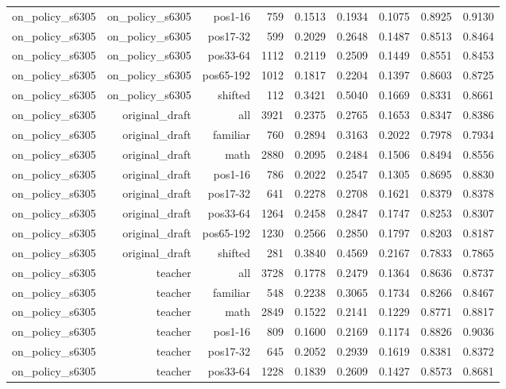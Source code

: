 \begin{tabular}{lrrrrrrrr}
on\_policy\_s6305 & on\_policy\_s6305 & pos1-16 & 759 & 0.1513 & 0.1934 & 0.1075 & 0.8925 & 0.9130 \\
on\_policy\_s6305 & on\_policy\_s6305 & pos17-32 & 599 & 0.2029 & 0.2648 & 0.1487 & 0.8513 & 0.8464 \\
on\_policy\_s6305 & on\_policy\_s6305 & pos33-64 & 1112 & 0.2119 & 0.2509 & 0.1449 & 0.8551 & 0.8453 \\
on\_policy\_s6305 & on\_policy\_s6305 & pos65-192 & 1012 & 0.1817 & 0.2204 & 0.1397 & 0.8603 & 0.8725 \\
on\_policy\_s6305 & on\_policy\_s6305 & shifted & 112 & 0.3421 & 0.5040 & 0.1669 & 0.8331 & 0.8661 \\
on\_policy\_s6305 & original\_draft & all & 3921 & 0.2375 & 0.2765 & 0.1653 & 0.8347 & 0.8386 \\
on\_policy\_s6305 & original\_draft & familiar & 760 & 0.2894 & 0.3163 & 0.2022 & 0.7978 & 0.7934 \\
on\_policy\_s6305 & original\_draft & math & 2880 & 0.2095 & 0.2484 & 0.1506 & 0.8494 & 0.8556 \\
on\_policy\_s6305 & original\_draft & pos1-16 & 786 & 0.2022 & 0.2547 & 0.1305 & 0.8695 & 0.8830 \\
on\_policy\_s6305 & original\_draft & pos17-32 & 641 & 0.2278 & 0.2708 & 0.1621 & 0.8379 & 0.8378 \\
on\_policy\_s6305 & original\_draft & pos33-64 & 1264 & 0.2458 & 0.2847 & 0.1747 & 0.8253 & 0.8307 \\
on\_policy\_s6305 & original\_draft & pos65-192 & 1230 & 0.2566 & 0.2850 & 0.1797 & 0.8203 & 0.8187 \\
on\_policy\_s6305 & original\_draft & shifted & 281 & 0.3840 & 0.4569 & 0.2167 & 0.7833 & 0.7865 \\
on\_policy\_s6305 & teacher & all & 3728 & 0.1778 & 0.2479 & 0.1364 & 0.8636 & 0.8737 \\
on\_policy\_s6305 & teacher & familiar & 548 & 0.2238 & 0.3065 & 0.1734 & 0.8266 & 0.8467 \\
on\_policy\_s6305 & teacher & math & 2849 & 0.1522 & 0.2141 & 0.1229 & 0.8771 & 0.8817 \\
on\_policy\_s6305 & teacher & pos1-16 & 809 & 0.1600 & 0.2169 & 0.1174 & 0.8826 & 0.9036 \\
on\_policy\_s6305 & teacher & pos17-32 & 645 & 0.2052 & 0.2939 & 0.1619 & 0.8381 & 0.8372 \\
on\_policy\_s6305 & teacher & pos33-64 & 1228 & 0.1839 & 0.2609 & 0.1427 & 0.8573 & 0.8681 \\

\end{tabular}
